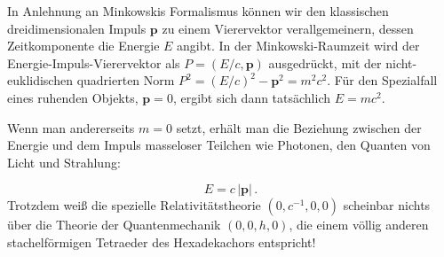 In Anlehnung an Minkowskis Formalismus können wir den klassischen dreidimensionalen Impuls $\mathbf{p}$ zu einem Vierervektor verallgemeinern, dessen Zeitkomponente die Energie $E$ angibt. In der Minkowski-Raumzeit wird der Energie-Impuls-Vierervektor als $P = (E/c, \mathbf{p})$ ausgedrückt, mit der nicht-euklidischen quadrierten Norm $P^2=(E/c)^2 - \mathbf{p}^2 = m^2c^2$. Für den Spezialfall eines ruhenden Objekts, $\mathbf{p} = 0$, ergibt sich dann tatsächlich $E=m c^2$.

Wenn man andererseits $m=0$ setzt, erhält man die Beziehung zwischen der Energie und dem Impuls masseloser Teilchen wie Photonen, den Quanten von Licht und Strahlung:

\begin{equation*}\label{emc2}
  E=c\, |\mathbf{p}|\,.
\end{equation*}
%
Trotzdem weiß die spezielle Relativitätstheorie $(0,c^{-1},0,0)$ scheinbar nichts über die Theorie der Quantenmechanik $(0,0,h,0)$, die einem völlig anderen stachelförmigen Tetraeder des Hexadekachors entspricht!


